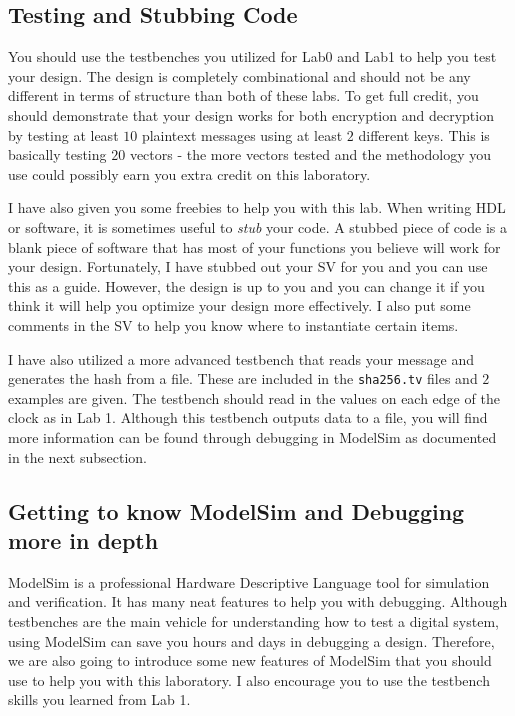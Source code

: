 \documentclass{article}
\begin{document}
\subsection{Testing and Stubbing Code}

You should use the testbenches you utilized for Lab0 and Lab1 to help
you test your design.  The design is completely combinational and
should not be any different in terms of structure than both of these
labs.  To get full credit, you should demonstrate that your design
works for both encryption and decryption by testing at least $10$
plaintext messages using at least $2$ different keys.  This is
basically testing $20$ vectors - the more vectors tested and the
methodology you use could possibly
earn you extra credit on this laboratory.

I have also given you some freebies to help you with this lab.  When
writing HDL or software, it is sometimes useful to \textit{stub} your
code.  A stubbed piece of code is a blank piece of software that has
most of your functions you believe will work for your design.
Fortunately, I have stubbed out your SV for you and you can use this
as a guide.  However, the design is up to you and you can change it if
you think it will help you optimize your design more effectively.
I also put some comments in the SV to help you know where
to instantiate certain items.

I have also utilized a more advanced testbench that reads your
message and generates the hash from a file.  These are included in the
\verb!sha256.tv! files and $2$ examples are given.  The testbench should
read in the values on each edge of the clock as in Lab 1.  Although
this testbench outputs data to a file, you will find more information
can be found through debugging in ModelSim as documented in the next
subsection.

\subsection{Getting to know ModelSim and Debugging more in depth}

ModelSim is a professional Hardware Descriptive Language tool for
simulation and verification.  It has many neat features to help you
with debugging.  Although testbenches are the main vehicle for
understanding how to test a digital system, using ModelSim can save
you hours and days in debugging a design.  Therefore, we are also
going to introduce some new features of ModelSim that you should use
to help you with this laboratory. I also encourage you to use the
testbench skills you learned from Lab 1.
\end{document}
